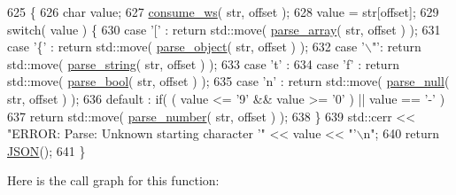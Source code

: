 \begin{DoxyCode}
625                                                          \{
626         \textcolor{keywordtype}{char} value;
627         \mbox{\hyperlink{namespacejson_1_1anonymous__namespace_02json_8hpp_03_a3a6e9a9e2d1cf7848055ae69f04be8b7}{consume\_ws}}( str, offset );
628         value = str[offset];
629         \textcolor{keywordflow}{switch}( value ) \{
630             \textcolor{keywordflow}{case} \textcolor{charliteral}{'['} : \textcolor{keywordflow}{return} std::move( \mbox{\hyperlink{namespacejson_1_1anonymous__namespace_02json_8hpp_03_a6a3598f1545d6015c9db8015fc42f7ff}{parse\_array}}( str, offset ) );
631             \textcolor{keywordflow}{case} \textcolor{charliteral}{'\{'} : \textcolor{keywordflow}{return} std::move( \mbox{\hyperlink{namespacejson_1_1anonymous__namespace_02json_8hpp_03_a69b6c8f8bb93130f5c6dab832000f915}{parse\_object}}( str, offset ) );
632             \textcolor{keywordflow}{case} \textcolor{charliteral}{'\(\backslash\)"'}: \textcolor{keywordflow}{return} std::move( \mbox{\hyperlink{namespacejson_1_1anonymous__namespace_02json_8hpp_03_a274c7a1f9001093d6b093abb5481122b}{parse\_string}}( str, offset ) );
633             \textcolor{keywordflow}{case} \textcolor{charliteral}{'t'} :
634             \textcolor{keywordflow}{case} \textcolor{charliteral}{'f'} : \textcolor{keywordflow}{return} std::move( \mbox{\hyperlink{namespacejson_1_1anonymous__namespace_02json_8hpp_03_ae47f0a41d47e83e2ce1f5f267e938c1e}{parse\_bool}}( str, offset ) );
635             \textcolor{keywordflow}{case} \textcolor{charliteral}{'n'} : \textcolor{keywordflow}{return} std::move( \mbox{\hyperlink{namespacejson_1_1anonymous__namespace_02json_8hpp_03_ad65e6ea0d2d880b099cf399600bf5666}{parse\_null}}( str, offset ) );
636             default  : \textcolor{keywordflow}{if}( ( value <= '9' && value >= \textcolor{charliteral}{'0'} ) || value == \textcolor{charliteral}{'-'} )
637                            \textcolor{keywordflow}{return} std::move( \mbox{\hyperlink{namespacejson_1_1anonymous__namespace_02json_8hpp_03_a9cc81652562c9d3c0f639ce43057f09a}{parse\_number}}( str, offset ) );
638         \}
639         std::cerr << \textcolor{stringliteral}{"ERROR: Parse: Unknown starting character '"} << value << \textcolor{stringliteral}{"'\(\backslash\)n"};
640         \textcolor{keywordflow}{return} \mbox{\hyperlink{class_j_s_o_n}{JSON}}();
641     \}
\end{DoxyCode}
Here is the call graph for this function\+:
\nopagebreak
